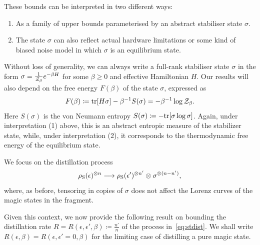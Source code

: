 \documentclass[pra,
aps,
twocolumn,
superscriptaddress,
groupedaddress,
nofootinbib,
reprint
]{revtex4-1}
\begin{document}
These bounds can be interpreted in two different ways: 
\begin{enumerate}
\item As a family of upper bounds parameterised by an abstract stabiliser state $\sigma$.
\item The state $\sigma$ can also reflect actual hardware limitations or some kind of biased noise model in which $\sigma$ is an equilibrium state.
\end{enumerate}
Without loss of generality, we can always write a full-rank stabiliser state $\sigma$ in the form $\sigma =  \frac{1}{\mathcal{Z}_\beta} e^{-\beta H}$ for some $\beta \geq 0$ and effective Hamiltonian $H$. Our results will also depend on the free energy $F(\beta)$ of the state $\sigma$, expressed as
\begin{equation}
	F(\beta) \coloneqq {\rm{tr}}[H \sigma] - \beta^{-1}S(\sigma) = -\beta^{-1}\log{\mathcal{Z}_\beta}.
\end{equation}
Here $S(\sigma)$ is the von Neumann entropy $S(\sigma) \coloneqq -{\rm{tr}}[\sigma\log{\sigma}]$. Again, under interpretation (1) above, this is an abstract entropic measure of the stabilizer state, while, under interpretation (2), it corresponds to the thermodynamic free energy of the equilibrium state.

We focus on the distillation process
\begin{equation}\label{eq:stdist}
	\rho_{\rm{S}}(\epsilon)^{\otimes n} \longrightarrow \rho_{\rm{S}}(\epsilon')^{\otimes n'} \otimes \sigma^{\otimes (n-n')},
\end{equation}
where, as before, tensoring in copies of $\sigma$ does not affect the Lorenz curves of the magic states in the fragment.

Given this context, we now provide the following result on bounding the distillation rate $R = R(\epsilon, \epsilon', \beta) \coloneqq \frac{n'}{n}$ of the process in~\cref{eq:stdist}. We shall write $R(\epsilon, \beta) = R(\epsilon, \epsilon'=0, \beta)$ for the limiting case of distilling a pure magic state.
\end{document}

